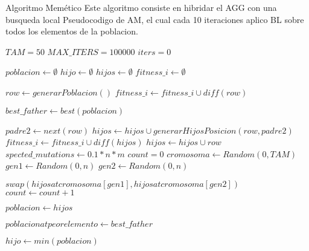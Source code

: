Algoritmo Memético
Este algoritmo consiste en hibridar el AGG con una busqueda local
Pseudocodigo de AM, el cual cada 10 iteraciones aplico BL sobre todos los elementos de la poblacion.
\begin{algorithm}[H]
  \begin{algorithmic}[1]
      \State $TAM = 50$
      \State $MAX\_ITERS = 100000$
      \State $iters = 0$

      \State $poblacion \gets \emptyset$ 
      \State $hijo \gets \emptyset$ 
      \State $hijos \gets \emptyset$
      \State $fitness\_i \gets \emptyset$
      
        \State $row \gets generarPoblacion()$
        \State $fitness\_i \gets fitness\_i \cup diff(row)$
      \EndFor

        \State $best\_father \gets  best(poblacion)$ 

          \State $padre2 \gets next(row)$ 
            \State $hijos \gets hijos \cup generarHijosPosicion(row,padre2)$
            \State $fitness\_i \gets fitness\_i \cup diff(hijos)$  
          \Else
            \State $hijos \gets hijos \cup row$
          \EndIf
        \EndFor
        \State $spected\_mutations \gets 0.1*n*m$
        \State $count = 0$
          \State $cromosoma \gets Random(0,TAM)$ 
          \State $gen1 \gets Random(0,n)$
          \State $gen2 \gets Random(0,n)$ 

           
            \State $swap(hijos at cromosoma[gen1], hijos at cromosoma[gen2])$
          \EndIf
          \State $count \gets count +1 $
        \EndWhile

        \State $poblacion \gets hijos$ 

         
          \State $poblacion at peor elemento \gets best\_father$
        \EndIf
      \EndWhile

      \State $hijo \gets min(poblacion)$
      
      \State {}
    \EndFunction
  \end{algorithmic}
\end{algorithm}



